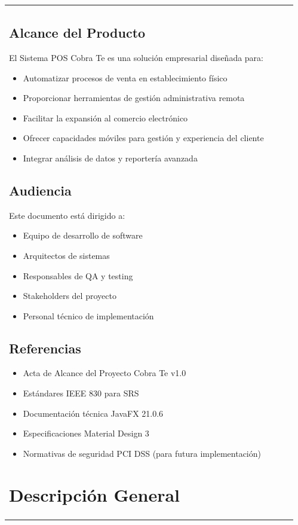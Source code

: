 \documentclass[12pt,letterpaper]{article}
\begin{document}
\begin{longtable}{|p{3cm}|p{2cm}|p{4cm}|p{6cm}|}
\subsection{Alcance del Producto}
El Sistema POS Cobra Te es una solución empresarial diseñada para:
\begin{itemize}
    \item Automatizar procesos de venta en establecimiento físico
    \item Proporcionar herramientas de gestión administrativa remota
    \item Facilitar la expansión al comercio electrónico
    \item Ofrecer capacidades móviles para gestión y experiencia del cliente
    \item Integrar análisis de datos y reportería avanzada
\end{itemize}

\subsection{Audiencia}
Este documento está dirigido a:
\begin{itemize}
    \item Equipo de desarrollo de software
    \item Arquitectos de sistemas
    \item Responsables de QA y testing
    \item Stakeholders del proyecto
    \item Personal técnico de implementación
\end{itemize}

\subsection{Referencias}
\begin{itemize}
    \item Acta de Alcance del Proyecto Cobra Te v1.0
    \item Estándares IEEE 830 para SRS
    \item Documentación técnica JavaFX 21.0.6
    \item Especificaciones Material Design 3
    \item Normativas de seguridad PCI DSS (para futura implementación)
\end{itemize}

\section{Descripción General}


\end{longtable}
\end{document}
